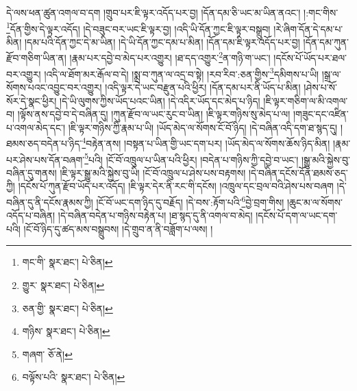 དེ་ལས་ཕན་ཚུན་འགལ་བ་དག །གྲུབ་པར་ཇི་ལྟར་འདོད་པར་བྱ། །དོན་དམ་ཅི་ཡང་མ་ཡིན་ནའང་། །:གང་གིས་\footnote{གང་གི་  སྣར་ཐང་།  པེ་ཅིན། }དོན་གྱིས་དེ་ལྟར་འདོད། །དེ་བཟུང་བར་ཡང་ཇི་ལྟར་བྱ། །འདི་ཡི་དོན་ཀྱང་ཇི་ལྟར་བསྒྲུབ། །རེ་ཞིག་དོན་དེ་དམ་པ་མིན། །དམ་པའི་དོན་ཀྱང་དེ་མ་ཡིན། །དེ་ཡི་དོན་ཀྱང་དམ་པ་མིན། །དོན་དམ་ཇི་ལྟར་འདོད་པར་བྱ། །དོན་དམ་ཀུན་རྫོབ་གཅིག་ཡིན་ན། །རྣམ་པར་དབྱེ་བ་མེད་པར་འགྱུར། །ཐ་དད་འགྱུར་\footnote{གྱུར་  སྣར་ཐང་།  པེ་ཅིན། }ན་གཉི་ག་ཡང་། །དངོས་པོ་ཡོད་པར་ཐལ་བར་འགྱུར། །འདི་ལ་ཐོག་མར་རྒོལ་བ་དེ། །སྨྲ་བ་ཀུན་ལ་འདྲ་བ་སྟེ། །རབ་རིབ་:ཅན་གྱིས་\footnote{ཅན་གྱི་  སྣར་ཐང་།  པེ་ཅིན། }དམིགས་པ་ཡི། །སྒྲ་ལ་སོགས་པའང་འབྱུང་བར་འགྱུར། །འདི་ལྟར་དེ་ཡང་བརྫུན་པའི་ཕྱིར། །དོན་དམ་པར་ནི་ཡོད་པ་མིན། །ཤེས་པ་སོ་སོར་དེ་སྣང་ཕྱིར། །དེ་ཡི་ལུགས་ཀྱིས་ཡོད་པའང་ཡིན། །དེ་འདིར་ཡོད་དང་མེད་པ་ཉིད། །ཇི་ལྟར་གཅིག་ལ་མི་འགལ་བ། །ལྟོས་ནས་དབྱེ་བ་དེ་བཞིན་དུ། །ཀུན་རྫོབ་ལ་ཡང་རུང་བ་ཡིན། །ཇི་ལྟར་གཉིས་སུ་མེད་པ་ལ། །གཟུང་དང་འཛིན་པ་འགལ་མེད་དང་། །ཇི་ལྟར་གཉིས་ཀྱི་རྣམ་པ་ཡི། །ཡོད་མེད་ལ་སོགས་ངོ་བོ་ཉིད། །དེ་བཞིན་འདི་དག་ཐ་སྙད་དུ། །ཐམས་ཅད་བདེན་པ་ཉིད་\footnote{གཉིས་  སྣར་ཐང་།  པེ་ཅིན། }བརྟེན་ནས། །བསྟན་པ་ཡིན་གྱི་ཡང་དག་པར། །ཡོད་མེད་ལ་སོགས་ཆོས་ཉིད་མིན། །རྣམ་པར་ཤེས་པས་དོན་བཞག་\footnote{གཞག་  ཅོ་ནེ། }པའི། །ངོ་བོ་འཁྲུལ་པ་ཡིན་པའི་ཕྱིར། །བདེན་པ་གཉིས་ཀྱི་དབྱེ་བ་ཡང་། །སྒྱུ་མའི་སྐྱེས་བུ་བཞིན་དུ་གནས། །ཇི་ལྟར་སྒྱུ་མའི་སྐྱེས་བུ་ཡི། །ངོ་བོ་འཁྲུལ་པ་ཤེས་པས་བརྟགས། །དེ་བཞིན་དངོས་དོན་ཐམས་ཅད་ཀྱི། །དངོས་པོ་ཀུན་རྫོབ་ཡོད་པར་འདོད། །ཇི་ལྟར་དེར་ནི་རང་གི་དངོས། །འཁྲུལ་དང་བྲལ་བའི་ཤེས་པས་བཞག །དེ་བཞིན་དུ་ནི་དངོས་རྣམས་ཀྱི། །ངོ་བོ་ཡང་དག་ཉིད་དུ་བརྗོད། །དེ་བས་:རྟོག་པའི་\footnote{བལྟོས་པའི་  སྣར་ཐང་།  པེ་ཅིན། }བྱེ་བྲག་གིས། །ཆུང་མ་ལ་སོགས་འདོད་པ་བཞིན། །དེ་བཞིན་བདེན་པ་གཉིས་བརྟེན་པ། །ཐ་སྙད་དུ་ནི་འགལ་བ་མེད། །དངོས་པོ་དག་ལ་ཡང་དག་པའི། །ངོ་བོ་ཉིད་དུ་ཚད་མས་བསྒྲུབས། །དེ་གྲུབ་ན་ནི་བཟློག་པ་ལས། །
